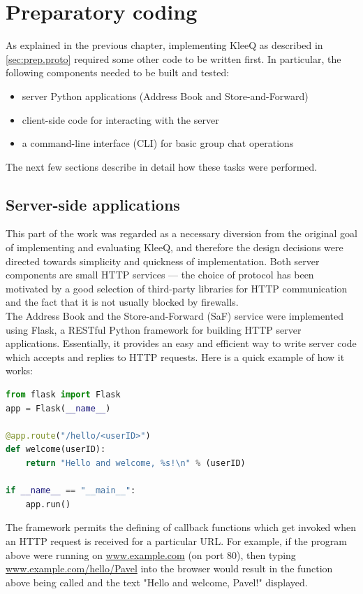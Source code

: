 \documentclass[a4paper, 12pt]{report}
\begin{document}
\section{Preparatory coding}
\label{sec:impl.prep}
As explained in the previous chapter, implementing KleeQ as described in \cref{sec:prep.proto} required some other code to be written first. In particular, the following components needed to be built and tested:
\begin{itemize}
    \item server Python applications (Address Book and Store-and-Forward)
    \item client-side code for interacting with the server
    \item a command-line interface (CLI) for basic group chat operations
\end{itemize}
The next few sections describe in detail how these tasks were performed.

\subsection{Server-side applications}
\label{subsec:impl.prep.server}
This part of the work was regarded as a necessary diversion from the original goal of implementing and evaluating KleeQ, and therefore the design decisions were directed towards simplicity and quickness of implementation. Both server components are small HTTP services --- the choice of protocol has been motivated by a good selection of third-party libraries for HTTP communication and the fact that it is not usually blocked by firewalls.\\

The Address Book and the Store-and-Forward (SaF) service were implemented using Flask, a RESTful Python framework for building HTTP server applications. Essentially, it provides an easy and efficient way to write server code which accepts and replies to HTTP requests. Here is a quick example of how it works: \\

\begin{lstlisting}[language = Python, columns=fullflexible]
from flask import Flask
app = Flask(__name__)

@app.route("/hello/<userID>")
def welcome(userID):
    return "Hello and welcome, %s!\n" % (userID)
    
if __name__ == "__main__":
    app.run()
\end{lstlisting}


The framework permits the defining of callback functions which get invoked when an HTTP request is received for a particular URL. For example, if the program above were running on \url{www.example.com} (on port 80), then typing \url{www.example.com/hello/Pavel} into the browser would result in the function above being called and the text "Hello and welcome, Pavel!" displayed. \\
\end{document}
